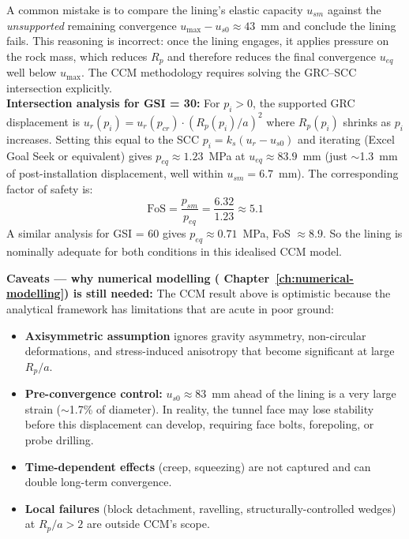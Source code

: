 \begin{warnbox}[GSI = 30 — solving the GRC--SCC intersection]
A common mistake is to compare the lining's elastic capacity $u_{sm}$ against the \textit{unsupported} remaining convergence $u_{\max} - u_{s0} \approx 43$~mm and conclude the lining fails. This reasoning is incorrect: once the lining engages, it applies pressure on the rock mass, which reduces $R_p$ and therefore reduces the final convergence $u_{eq}$ well below $u_{\max}$. The CCM methodology requires solving the GRC--SCC intersection explicitly.\\[4pt]

\textbf{Intersection analysis for GSI = 30:} For $p_i > 0$, the supported GRC displacement is $u_r(p_i) = u_r(p_{cr}) \cdot (R_p(p_i)/a)^2$ where $R_p(p_i)$ shrinks as $p_i$ increases. Setting this equal to the SCC $p_i = k_s(u_r - u_{s0})$ and iterating (Excel Goal Seek or equivalent) gives $p_{eq} \approx 1.23$~MPa at $u_{eq} \approx 83.9$~mm (just $\sim$1.3~mm of post-installation displacement, well within $u_{sm} = 6.7$~mm). The corresponding factor of safety is:
\[
\mathrm{FoS} = \frac{p_{sm}}{p_{eq}} = \frac{6.32}{1.23} \approx 5.1
\]
A similar analysis for GSI = 60 gives $p_{eq} \approx 0.71$~MPa, FoS $\approx 8.9$. So the lining is nominally adequate for both conditions in this idealised CCM model.

\textbf{Caveats — why numerical modelling ( Chapter~\ref{ch:numerical-modelling}) is still needed:} The CCM result above is optimistic because the analytical framework has limitations that are acute in poor ground:
\begin{itemize}[nosep]
 \item \textbf{Axisymmetric assumption} ignores gravity asymmetry, non-circular deformations, and stress-induced anisotropy that become significant at large $R_p/a$.
 \item \textbf{Pre-convergence control:} $u_{s0} \approx 83$~mm ahead of the lining is a very large strain ($\sim$1.7\% of diameter). In reality, the tunnel face may lose stability before this displacement can develop, requiring face bolts, forepoling, or probe drilling.
 \item \textbf{Time-dependent effects} (creep, squeezing) are not captured and can double long-term convergence.
 \item \textbf{Local failures} (block detachment, ravelling, structurally-controlled wedges) at $R_p/a > 2$ are outside CCM's scope.
\end{itemize}


\end{warnbox}
